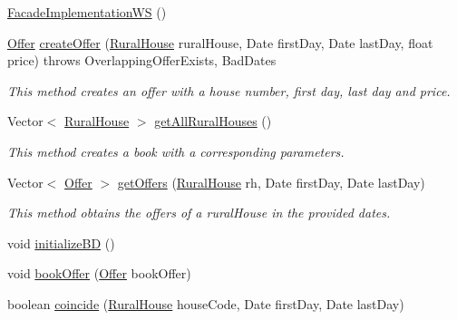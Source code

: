 \begin{DoxyCompactItemize}
\item 
\mbox{\hyperlink{classbusinessLogic_1_1FacadeImplementationWS_a22415eec1f4d0a160f02cfdc1ac80825}{Facade\+Implementation\+WS}} ()
\item 
\mbox{\hyperlink{classdomain_1_1Offer}{Offer}} \mbox{\hyperlink{classbusinessLogic_1_1FacadeImplementationWS_ac7b3bdfd0815ea7c787da312de594cce}{create\+Offer}} (\mbox{\hyperlink{classdomain_1_1RuralHouse}{Rural\+House}} rural\+House, Date first\+Day, Date last\+Day, float price)  throws Overlapping\+Offer\+Exists, Bad\+Dates 
\begin{DoxyCompactList}\small\item\em This method creates an offer with a house number, first day, last day and price. \end{DoxyCompactList}\item 
Vector$<$ \mbox{\hyperlink{classdomain_1_1RuralHouse}{Rural\+House}} $>$ \mbox{\hyperlink{classbusinessLogic_1_1FacadeImplementationWS_aa6f21ddb40ca6cd752a13e31ff016e7e}{get\+All\+Rural\+Houses}} ()
\begin{DoxyCompactList}\small\item\em This method creates a book with a corresponding parameters. \end{DoxyCompactList}\item 
Vector$<$ \mbox{\hyperlink{classdomain_1_1Offer}{Offer}} $>$ \mbox{\hyperlink{classbusinessLogic_1_1FacadeImplementationWS_a7489fb15fdb8206b16daf6ed24fdfea0}{get\+Offers}} (\mbox{\hyperlink{classdomain_1_1RuralHouse}{Rural\+House}} rh, Date first\+Day, Date last\+Day)
\begin{DoxyCompactList}\small\item\em This method obtains the offers of a rural\+House in the provided dates. \end{DoxyCompactList}\item 
void \mbox{\hyperlink{classbusinessLogic_1_1FacadeImplementationWS_a94a4600e9c80794676f06c888e9e682d}{initialize\+BD}} ()
\item 
void \mbox{\hyperlink{classbusinessLogic_1_1FacadeImplementationWS_a0c3a269d277719643ca61e030580812a}{book\+Offer}} (\mbox{\hyperlink{classdomain_1_1Offer}{Offer}} book\+Offer)
\item 
boolean \mbox{\hyperlink{classbusinessLogic_1_1FacadeImplementationWS_a6e8399739161cbb6a2830ebb9279de90}{coincide}} (\mbox{\hyperlink{classdomain_1_1RuralHouse}{Rural\+House}} house\+Code, Date first\+Day, Date last\+Day)
\end{DoxyCompactItemize}


